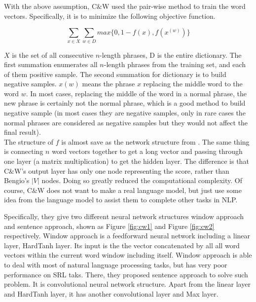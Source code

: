 With the above assumption, C$\&$W used the pair-wise method to train the word vectors. Specifically, it is to minimize the following objective function.

$$\sum_{x\in X}\sum_{w\in D}max\{0,1-f(x),f(x^{(w)})\}$$

$X$ is the set of all consecutive $n$-length phrases, D is the entire dictionary. The first summation enumerates all $n$-length phrases from the training set, and each of them positive sample. The second summation for dictionary is to build negative samples. $x(w)$ means the phrase $x$ replacing the middle word to the word $w$. In most cases, replacing the middle of the word in a normal phrase, the new phrase is certainly not the normal phrase, which is a good method to build negative sample (in most cases they are negative samples, only in rare cases the normal phrases are considered as negative samples but they would not affect the final result). \\

The structure of $f$ is almost save as the network structure from \citep{bengio2003neural}. The same thing is connecting $n$ word vectors together to get a long vector and passing through one layer (a matrix multiplication) to get the hidden layer. The difference is that C$\&$W's output layer has only one node representing the score, rather than Bengio's $|V|$ nodes. Doing so greatly reduced the computational complexity. Of course, C$\&$W does not want to make a real language model, but just use some idea from the language model to assist them to complete other tasks in NLP. 

Specifically, they give two different neural network structures window approach and sentence approach, shown as Figure \ref{fig:cw1} and Figure \ref{fig:cw2} respectively. Window approach is a feedforward neural network including a linear layer, HardTanh layer. Its input is the the vector concatenated by all all word vectors within the current word window including itself. Window approach is able to deal with most of natural language processing tasks, but has very poor performance on SRL taks. There, they proposed sentence approach to solve such problem. It is convolutional neural network structure. Apart from the linear layer and HardTanh layer, it has another convolutional layer and Max layer. 

